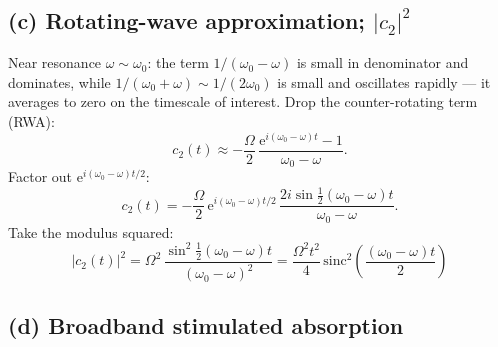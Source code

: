 \documentclass[11pt]{article}
\begin{document}
\subsection*{(c) Rotating-wave approximation; \texorpdfstring{$|c_{2}|^{2}$}{|c2|^2}}

Near resonance $\omega\sim\omega_{0}$: the term $1/(\omega_{0}-\omega)$ is small in denominator and dominates, while $1/(\omega_{0}+\omega)\sim 1/(2\omega_{0})$ is small and oscillates rapidly --- it averages to zero on the timescale of interest. Drop the counter-rotating term (RWA):
\[
c_{2}(t)\approx-\frac{\Omega}{2}\,\frac{\mathrm{e}^{i(\omega_{0}-\omega)t}-1}{\omega_{0}-\omega}.
\]
Factor out $\mathrm{e}^{i(\omega_{0}-\omega)t/2}$:
\[
c_{2}(t)=-\frac{\Omega}{2}\,\mathrm{e}^{i(\omega_{0}-\omega)t/2}\,\frac{2i\sin\!\tfrac{1}{2}(\omega_{0}-\omega)t}{\omega_{0}-\omega}.
\]
Take the modulus squared:
\[
\boxed{\;|c_{2}(t)|^{2}=\Omega^{2}\,\frac{\sin^{2}\!\tfrac{1}{2}(\omega_{0}-\omega)t}{(\omega_{0}-\omega)^{2}}=\frac{\Omega^{2}t^{2}}{4}\,\mathrm{sinc}^{2}\!\!\left(\frac{(\omega_{0}-\omega)t}{2}\right)\;}
\]

\subsection*{(d) Broadband stimulated absorption}
\end{document}
